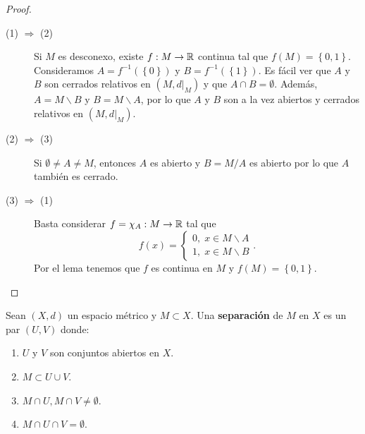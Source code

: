 \begin{proof}
\begin{description}
	\item[(1) $\displaystyle \Rightarrow $ (2)] Si $\displaystyle M $ es desconexo, existe $\displaystyle f : M \to \mathbb{R} $ continua tal que $\displaystyle f\left(M\right) = \left\{ 0,1\right\}  $. Consideramos $\displaystyle A = f^{-1}\left( \left\{ 0\right\} \right) $ y $\displaystyle B = f^{-1}\left( \left\{ 1\right\} \right) $. Es fácil ver que $\displaystyle A $ y $\displaystyle B $ son cerrados relativos en $\displaystyle \left(M, d|_{M}\right) $ y que $\displaystyle A \cap B= \emptyset $. Además, $\displaystyle A = M\backslash B $ y $\displaystyle B = M\backslash A $, por lo que $\displaystyle A $ y $\displaystyle B $ son a la vez abiertos y cerrados relativos en $\displaystyle \left(M, d|_{M}\right) $. 
	\item[(2) $\Rightarrow$ (3)] Si $\displaystyle \emptyset \neq A \neq M $, entonces $\displaystyle A $ es abierto y $\displaystyle B = M / A $ es abierto por lo que $\displaystyle A $ también es cerrado. 
	\item[(3) $\displaystyle \Rightarrow $ (1)] Basta considerar $\displaystyle f = \chi_{A} : M \to \mathbb{R} $ tal que 
		\[f\left(x\right) = 
		\begin{cases}
		0, \; x \in M \backslash A \\
		1, \; x \in M \backslash B
		\end{cases}
		.\]
		Por el lema tenemos que $\displaystyle f $ es continua en $\displaystyle M $ y $\displaystyle f\left(M\right) = \left\{ 0,1\right\}  $. 		
\end{description}
\end{proof}
\begin{definition}[Separación]
Sean $\displaystyle \left(X,d\right) $ un espacio métrico y $\displaystyle M \subset X $. Una \textbf{separación} de $\displaystyle M $ en $\displaystyle X $ es un par $\displaystyle \left(U,V\right) $ donde:
\begin{enumerate}
\item $\displaystyle U $ y $\displaystyle V $ son conjuntos abiertos en $\displaystyle X $.
\item $\displaystyle M \subset U \cup V $. 
\item $\displaystyle M \cap U, M \cap V \neq \emptyset $. 
\item $\displaystyle M \cap U \cap V = \emptyset$.
\end{enumerate}
\end{definition}
